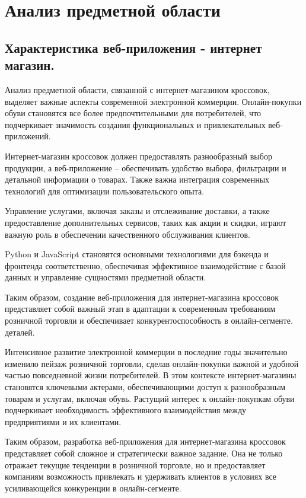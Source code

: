 \section{Анализ предметной области}
\subsection{Характеристика веб-приложения - интернет магазин.}

Анализ предметной области, связанной с интернет-магазином кроссовок, выделяет важные аспекты современной электронной коммерции. Онлайн-покупки обуви становятся все более предпочтительными для потребителей, что подчеркивает значимость создания функциональных и привлекательных веб-приложений.

Интернет-магазин кроссовок должен предоставлять разнообразный выбор продукции, а веб-приложение – обеспечивать удобство выбора, фильтрации и детальной информации о товарах. Также важна интеграция современных технологий для оптимизации пользовательского опыта.

Управление услугами, включая заказы и отслеживание доставки, а также предоставление дополнительных сервисов, таких как акции и скидки, играют важную роль в обеспечении качественного обслуживания клиентов.

Python и JavaScript становятся основными технологиями для бэкенда и фронтенда соответственно, обеспечивая эффективное взаимодействие с базой данных и управление сущностями предметной области.

Таким образом, создание веб-приложения для интернет-магазина кроссовок представляет собой важный этап в адаптации к современным требованиям розничной торговли и обеспечивает конкурентоспособность в онлайн-сегменте. деталей.

Интенсивное развитие электронной коммерции в последние годы значительно изменило пейзаж розничной торговли, сделав онлайн-покупки важной и удобной частью повседневной жизни потребителей. В этом контексте интернет-магазины становятся ключевыми актерами, обеспечивающими доступ к разнообразным товарам и услугам, включая обувь. Растущий интерес к онлайн-покупкам обуви подчеркивает необходимость эффективного взаимодействия между предприятиями и их клиентами.

Таким образом, разработка веб-приложения для интернет-магазина кроссовок представляет собой сложное и стратегически важное задание. Она не только отражает текущие тенденции в розничной торговле, но и предоставляет компаниям возможность привлекать и удерживать клиентов в условиях все усиливающейся конкуренции в онлайн-сегменте.